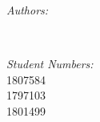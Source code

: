 \documentclass[12pt]{article}
\makeatletter
\newcommand{\studentnumber}{1807584 \\ 1797103 \\ 1801499}
\let\theauthor\@author
\makeatother
\begin{document}
\begin{titlepage}
        \begin{minipage}{0.4\textwidth}
               \begin{flushleft} \large
                       \emph{Authors:}\\
                       \theauthor
                       \end{flushleft}
                       \end{minipage}~
                       \begin{minipage}{0.4\textwidth}
                       \begin{flushright} \large
                       \emph{Student Numbers:} \\
                       \studentnumber
               \end{flushright}
        \end{minipage}\\[2 cm]
 
 
        \vfill
 
\end{titlepage}
 
 
\tableofcontents
\pagebreak
 
 
\pagebreak
 
\end{document}
